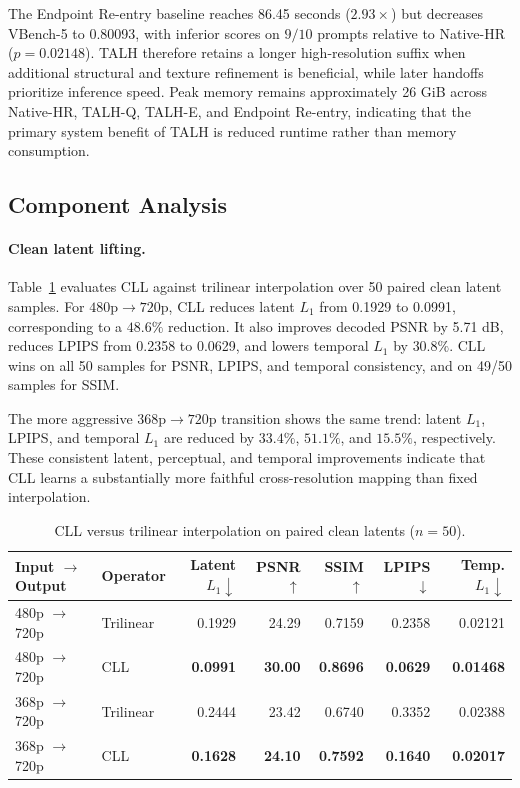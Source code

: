 The Endpoint Re-entry baseline reaches 86.45 seconds
(\(2.93\times\)) but decreases VBench-5 to 0.80093, with inferior
scores on \(9/10\) prompts relative to Native-HR
(\(p=0.02148\)). TALH therefore retains a longer high-resolution suffix
when additional structural and texture refinement is beneficial, while
later handoffs prioritize inference speed. Peak memory remains
approximately 26 GiB across Native-HR, TALH-Q, TALH-E, and Endpoint
Re-entry, indicating that the primary system benefit of TALH is reduced
runtime rather than memory consumption.

\subsection{Component Analysis}

\paragraph{Clean latent lifting.}
Table~\ref{tab:operator} evaluates CLL against trilinear interpolation
over 50 paired clean latent samples. For
\(480\text{p}\rightarrow720\text{p}\), CLL reduces latent \(L_1\) from
0.1929 to 0.0991, corresponding to a \(48.6\%\) reduction. It also
improves decoded PSNR by 5.71 dB, reduces LPIPS from 0.2358 to 0.0629,
and lowers temporal \(L_1\) by \(30.8\%\). CLL wins on all 50 samples
for PSNR, LPIPS, and temporal consistency, and on 49/50 samples for
SSIM.

The more aggressive \(368\text{p}\rightarrow720\text{p}\) transition
shows the same trend: latent \(L_1\), LPIPS, and temporal \(L_1\) are
reduced by \(33.4\%\), \(51.1\%\), and \(15.5\%\), respectively.
These consistent latent, perceptual, and temporal improvements indicate
that CLL learns a substantially more faithful cross-resolution mapping
than fixed interpolation.

\begin{table}[!t]
\centering
\footnotesize
\setlength{\tabcolsep}{5pt}
\begin{tabular}{llrrrrr}
\toprule
Input $\rightarrow$ Output & Operator & Latent $L_1\downarrow$ &
PSNR $\uparrow$ & SSIM $\uparrow$ & LPIPS $\downarrow$ &
Temp. $L_1\downarrow$ \\
\midrule
480p $\rightarrow$ 720p & Trilinear & 0.1929 & 24.29 & 0.7159 &
0.2358 & 0.02121 \\
480p $\rightarrow$ 720p & CLL & \textbf{0.0991} & \textbf{30.00} &
\textbf{0.8696} & \textbf{0.0629} & \textbf{0.01468} \\
368p $\rightarrow$ 720p & Trilinear & 0.2444 & 23.42 & 0.6740 &
0.3352 & 0.02388 \\
368p $\rightarrow$ 720p & CLL & \textbf{0.1628} & \textbf{24.10} &
\textbf{0.7592} & \textbf{0.1640} & \textbf{0.02017} \\
\bottomrule
\end{tabular}
\caption{CLL versus trilinear interpolation on paired clean latents
(\(n=50\)).}
\label{tab:operator}
\end{table}

